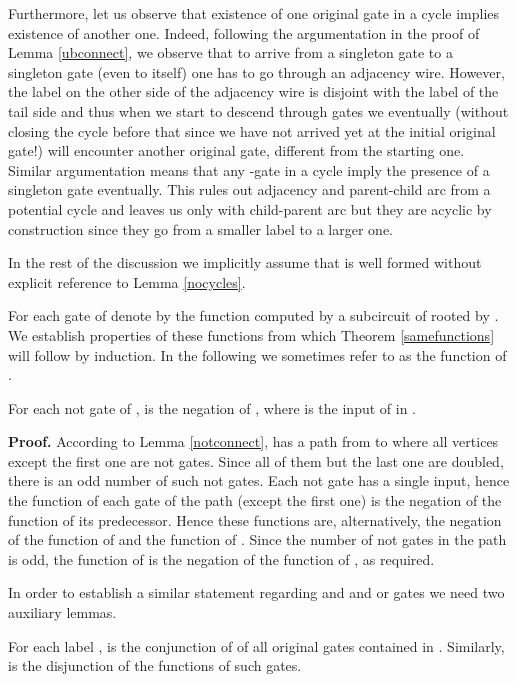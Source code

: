 \documentclass{llncs}
\begin{document}
Furthermore, let us observe that existence of one original gate in a cycle implies existence of another one. Indeed, 
following the argumentation in the proof of Lemma \ref{ubconnect}, we observe that to arrive from a singleton gate to a singleton gate (even to itself) one has to go through an adjacency wire. However, the label on the other side of the adjacency wire is disjoint with the label of the tail side and thus when we start to descend through  gates we eventually (without closing the cycle before that since we have not arrived yet at the initial original gate!) will encounter another original gate, different from the starting one. Similar argumentation means that any -gate in a cycle imply the presence of a singleton gate eventually. This rules out adjacency and parent-child arc from a potential cycle and leaves us only with child-parent arc but they are acyclic by construction since they go from a smaller label to a larger one. 

In the rest of the discussion we implicitly assume that  is well formed without explicit reference to Lemma \ref{nocycles}.


For each gate  of  denote by  the function
computed by a subcircuit of  rooted by . We establish properties of these functions from which
Theorem \ref{samefunctions} will follow by induction. 
In the following we sometimes refer to   as the function of .

\begin{lemma} \label{notfunction}
For each {\sc not} gate  of ,  is the negation of , where  is the input
of  in .
\end{lemma}

{\bf Proof.}
According to Lemma \ref{notconnect},  has a path from 
 to  where all vertices except the first one are {\sc not} gates.
Since all of them but the last one are doubled, there is an odd number of such {\sc not} gates. Each {\sc not} gate has 
a single input, hence the function of each gate of the path (except the first one) is the negation of the function of its predecessor.
Hence these functions are, alternatively, the negation of the function of  and the function of . Since the number of 
{\sc not} gates in the path is odd, the function of  is the negation of the function of , as required. 

In order to establish a similar statement regarding {\sc and} and {\sc or} gates we need two auxiliary lemmas.

\begin{lemma} \label{childparentconnect}
For each label ,  is the conjunction of
 of all original gates  contained in . Similarly,  is the disjunction of the functions of such gates.
\end{lemma}
\end{document}
